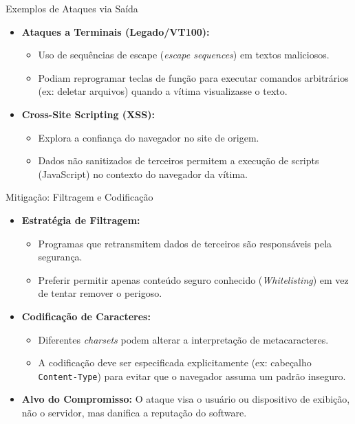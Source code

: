 \begin{frame}{Exemplos de Ataques via Saída}
    \begin{itemize}
        \item \textbf{Ataques a Terminais (Legado/VT100):}
              \begin{itemize}
                  \item Uso de sequências de escape (\textit{escape sequences}) em textos maliciosos.
                  \item Podiam reprogramar teclas de função para executar comandos arbitrários (ex: deletar arquivos) quando a vítima visualizasse o texto.
              \end{itemize}

        \item \textbf{Cross-Site Scripting (XSS):}
              \begin{itemize}
                  \item Explora a confiança do navegador no site de origem.
                  \item Dados não sanitizados de terceiros permitem a execução de scripts (JavaScript) no contexto do navegador da vítima.
              \end{itemize}
    \end{itemize}
\end{frame}

\begin{frame}{Mitigação: Filtragem e Codificação}
    \begin{itemize}
        \item \textbf{Estratégia de Filtragem:}
              \begin{itemize}
                  \item Programas que retransmitem dados de terceiros são responsáveis pela segurança.
                  \item Preferir permitir apenas conteúdo seguro conhecido (\textit{Whitelisting}) em vez de tentar remover o perigoso.
              \end{itemize}

        \item \textbf{Codificação de Caracteres:}
              \begin{itemize}
                  \item Diferentes \textit{charsets} podem alterar a interpretação de metacaracteres.
                  \item A codificação deve ser especificada explicitamente (ex: cabeçalho \texttt{Content-Type}) para evitar que o navegador assuma um padrão inseguro.
              \end{itemize}

        \item \textbf{Alvo do Compromisso:} O ataque visa o usuário ou dispositivo de exibição, não o servidor, mas danifica a reputação do software.
    \end{itemize}
\end{frame}